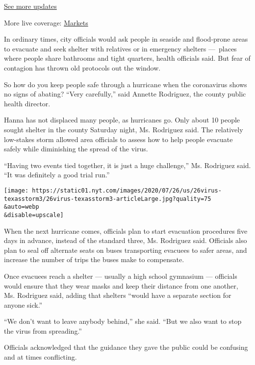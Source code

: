 \href{https://www.nytimes.com/2020/08/03/world/coronavirus-covid-19.html?action=click\&pgtype=Article\&state=default\&region=MAIN_CONTENT_1\&context=storylines_live_updates}{See
more updates}

More live coverage:
\href{https://www.nytimes.com/live/2020/08/03/business/stock-market-today-coronavirus?action=click\&pgtype=Article\&state=default\&region=MAIN_CONTENT_1\&context=storylines_live_updates}{Markets}

In ordinary times, city officials would ask people in seaside and
flood-prone areas to evacuate and seek shelter with relatives or in
emergency shelters ---~places where people share bathrooms and tight
quarters, health officials said. But fear of contagion has thrown old
protocols out the window.

So how do you keep people safe through a hurricane when the coronavirus
shows no signs of abating? ``Very carefully,'' said Annette Rodriguez,
the county public health director.

Hanna has not displaced many people, as hurricanes go. Only about 10
people sought shelter in the county Saturday night, Ms. Rodriguez said.
The relatively low-stakes storm allowed area officials to assess how to
help people evacuate safely while diminishing the spread of the virus.

``Having two events tied together, it is just a huge challenge,'' Ms.
Rodriguez said. ``It was definitely a good trial run.''

\texttt{[image: https://static01.nyt.com/images/2020/07/26/us/26virus-texasstorm3/26virus-texasstorm3-articleLarge.jpg?quality=75\\\&auto=webp\\\&disable=upscale]}

When the next hurricane comes, officials plan to start evacuation
procedures five days in advance, instead of the standard three, Ms.
Rodriguez said. Officials also plan to seal off alternate seats on buses
transporting evacuees to safer areas, and increase the number of trips
the buses make to compensate.

Once evacuees reach a shelter --- usually a high school gymnasium ---
officials would ensure that they wear masks and keep their distance from
one another, Ms. Rodriguez said, adding that shelters ``would have a
separate section for anyone sick.''

``We don't want to leave anybody behind,'' she said. ``But we also want
to stop the virus from spreading.''

Officials acknowledged that the guidance they gave the public could be
confusing and at times conflicting.

